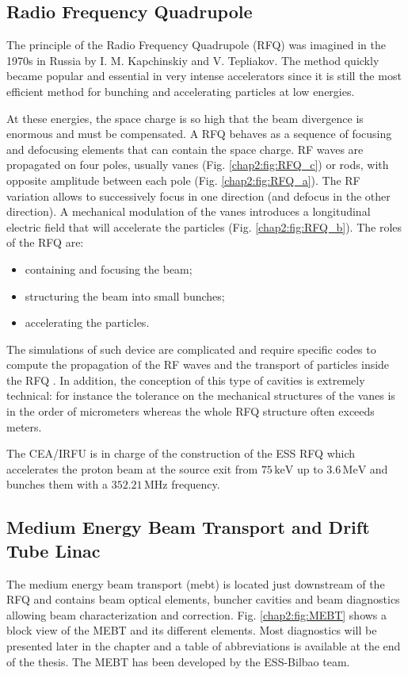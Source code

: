 \begin{refsection}
  \subsection{Radio Frequency Quadrupole}
  The principle of the Radio Frequency Quadrupole (RFQ) was imagined in the 1970s in Russia by I. M. Kapchinskiy and V. Tepliakov. The method quickly became popular and essential in very intense accelerators since it is still the most efficient method for bunching and accelerating particles at low energies.

  At these energies, the space charge is so high that the beam divergence is enormous and must be compensated. A RFQ behaves as a sequence of focusing and defocusing elements that can contain the space charge. RF waves are propagated on four poles, usually vanes (Fig. \ref{chap2:fig:RFQ_c}) or rods, with opposite amplitude between each pole (Fig. \ref{chap2:fig:RFQ_a}). The RF variation allows to successively focus in one direction (and defocus in the other direction). A mechanical modulation of the vanes introduces a longitudinal electric field that will accelerate the particles (Fig. \ref{chap2:fig:RFQ_b}). The roles of the RFQ are:
  \begin{itemize}
    \item containing and focusing the beam;
    \item structuring the beam into small bunches;
    \item accelerating the particles.
  \end{itemize}

  

  The simulations of such device are complicated and require specific codes to compute the propagation of the RF waves and the transport of particles inside the RFQ \cite{Duperrier2000}. In addition, the conception of this type of cavities is extremely technical: for instance the tolerance on the mechanical structures of the vanes is in the order of micrometers whereas the whole RFQ structure often exceeds meters.

  The CEA/IRFU is in charge of the construction of the ESS RFQ \cite{ChirpazIPAC2016} which accelerates the proton beam at the source exit from $75\,\mathrm{keV}$ up to $3.6\,\mathrm{MeV}$ and bunches them with a $352.21\,\mathrm{MHz}$ frequency.

  \subsection{Medium Energy Beam Transport and Drift Tube Linac}
  The medium energy beam transport (\acrshort{mebt}) is located just downstream of the RFQ and contains beam optical elements, buncher cavities and beam diagnostics allowing beam characterization and correction. Fig. \ref{chap2:fig:MEBT} shows a block view of the MEBT and its different elements. Most diagnostics will be presented later in the chapter and a table of abbreviations is available at the end of the thesis. The MEBT has been developed by the ESS-Bilbao team.


\end{refsection}
